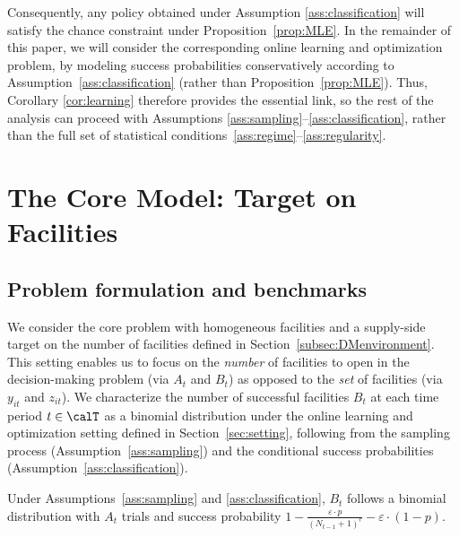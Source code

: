 \documentclass[blindrev]{informs3noheader}
\begin{document}
Consequently, any policy obtained under Assumption \ref{ass:classification} will satisfy the chance constraint under Proposition~\ref{prop:MLE}. In the remainder of this paper, we will consider the corresponding online learning and optimization problem, by modeling success probabilities conservatively according to Assumption~\ref{ass:classification} (rather than Proposition~\ref{prop:MLE}). Thus, Corollary \ref{cor:learning} therefore provides the essential link, so the rest of the analysis can proceed with Assumptions \ref{ass:sampling}--\ref{ass:classification}, rather than the full set of statistical conditions~\ref{ass:regime}–\ref{ass:regularity}.
    
\section{The Core Model: Target on Facilities}
\label{sec:base}

\subsection{Problem formulation and benchmarks}

We consider the core problem with homogeneous facilities and a supply-side target on the number of facilities defined in Section~\ref{subsec:DMenvironment}. This setting enables us to focus on the \textit{number} of facilities to open in the decision-making problem (via $A_t$ and $B_t$) as opposed to the \textit{set} of facilities (via $y_{it}$ and $z_{it}$). We characterize the number of successful facilities $B_t$ at each time period $t\in\calT$ as a binomial distribution under the online learning and optimization setting defined in Section~\ref{sec:setting}, following from the sampling process (Assumption~\ref{ass:sampling}) and the conditional success probabilities (Assumption~\ref{ass:classification}).
\begin{corollary}\label{cor:success}
Under Assumptions~\ref{ass:sampling} and \ref{ass:classification}, $B_t$ follows a binomial distribution with $A_t$ trials and success probability $1- \frac{\varepsilon\cdot p}{\left(N_{t-1} + 1\right)^r}-\varepsilon\cdot(1-p)$. 
\end{corollary}
\end{document}
